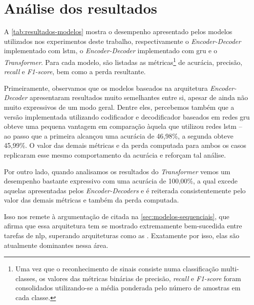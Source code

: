 \section{Análise dos resultados}
\label{sec:avaliacao-resultados}

A \autoref{tab:resultados-modelos} mostra o desempenho apresentado pelos modelos utilizados nos experimentos deste trabalho, respectivamente o \textit{Encoder-Decoder} implementado com \acrshort{lstm}, o \textit{Encoder-Decoder} implementado com \acrshort{gru} e o \textit{Transformer}.
Para cada modelo, são listadas as métricas\footnote{
    Uma vez que o reconhecimento de sinais consiste numa classificação multi-classes, os valores das métricas binárias de precisão, \textit{recall} e \textit{F1-score} foram consolidados utilizando-se a média ponderada pelo número de amostras em cada classe.
} de acurácia, precisão, \textit{recall} e \textit{F1-score}, bem como a perda resultante.





Primeiramente, observamos que os modelos baseados na arquitetura \textit{Encoder-Decoder} apresentaram resultados muito semelhantes entre si, apesar de ainda não muito expressivos de um modo geral.
Dentre eles, percebemos também que a versão implementada utilizando codificador e decodificador baseados em redes \acrshort{gru} obteve uma pequena vantagem em comparação àquela que utilizou redes \acrshort{lstm} -- ao passo que a primeira alcançou uma acurácia de 46,98\%, a segunda obteve 45,99\%.
O valor das demais métricas e da perda computada para ambos os casos replicaram esse mesmo comportamento da acurácia e reforçam tal análise.

Por outro lado, quando analisamos os resultados do \textit{Transformer} vemos um desempenho bastante expressivo com uma acurácia de 100,00\%, a qual excede aquelas apresentadas pelos \textit{Encoder-Decoders} e é reiterada consistentemente pelo valor das demais métricas e também da perda computada.

Isso nos remete à argumentação de  citada na \autoref{sec:modelos-sequenciais}, que afirma que essa arquitetura tem se mostrado extremamente bem-sucedida entre tarefas de \acrfull{nlp}, superando arquiteturas como as . Exatamente por isso, elas são atualmente dominantes nessa área.

